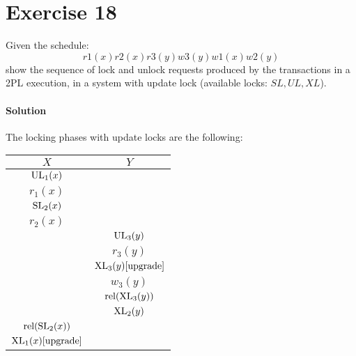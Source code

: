 \section{Exercise 18}

Given the schedule:
\[r1(x) r2(x) r3(y) w3(y) w1(x) w2(y)\]
show the sequence of lock and unlock requests produced by the transactions in a 2PL execution, in a system with update lock (available locks: $SL, UL, XL$).

\paragraph*{Solution}
The locking phases with update locks are the following: 
\begin{table}[H]
    \centering
    \begin{tabular}{|c|c|}
    \hline
    $X$                                           & $Y$                                           \\ \hline
    $\textnormal{UL}_1(x)$                        &                                               \\
    $r_1(x)$                                      &                                               \\
    $\textnormal{SL}_2(x)$                        &                                               \\
    $r_2(x)$                                      &                                               \\
                                                    & $\textnormal{UL}_3(y)$                        \\
                                                    & $r_3(y)$                                      \\
                                                    & $\textnormal{XL}_3(y) [\textnormal{upgrade}]$ \\
                                                    & $w_3(y)$                                      \\
                                                    & $\textnormal{rel}(\textnormal{XL}_3(y))$      \\
                                                    & $\textnormal{XL}_2(y)$                        \\
    $\textnormal{rel}(\textnormal{SL}_2(x))$      &                                               \\
    $\textnormal{XL}_1(x) [\textnormal{upgrade}]$ &                                               \\

\end{tabular}
\end{table}
